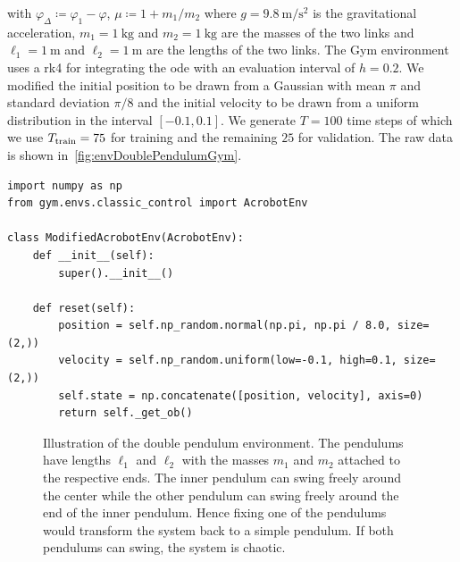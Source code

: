 			with \( \varphi_\Delta \coloneqq \varphi_1 - \varphi \), \( \mu \coloneqq 1 + m_1/m_2 \) where \( g = \SI{9.8}{\meter\per\second\squared} \) is the gravitational acceleration, \( m_1 = \SI{1}{\kilogram} \) and \( m_2 = \SI{1}{\kilogram} \) are the masses of the two links and \( \ell_1 = \SI{1}{\meter} \) and \( \ell_2 = \SI{1}{\meter} \) are the lengths of the two links. The Gym environment uses a \ac{rk4} for integrating the \ac{ode} with an evaluation interval of \( h = 0.2 \). We modified the initial position to be drawn from a Gaussian with mean \( \pi \) and standard deviation \( \pi/8 \) and the initial velocity to be drawn from a uniform distribution in the interval \( [-0.1, 0.1] \). We generate \( T = 100 \) time steps of which we use \( T_{\mathrm{train}} = 75 \) for training and the remaining \(25\) for validation. The raw data is shown in~\autoref{fig:envDoublePendulumGym}.

			\begin{lstlisting}[caption={Modification of Gym's acrobot environment to start at the top instead of hanging down.}, label=lst:topAcrobot]
import numpy as np
from gym.envs.classic_control import AcrobotEnv

class ModifiedAcrobotEnv(AcrobotEnv):
	def __init__(self):
		super().__init__()

	def reset(self):
		position = self.np_random.normal(np.pi, np.pi / 8.0, size=(2,))
		velocity = self.np_random.uniform(low=-0.1, high=0.1, size=(2,))
		self.state = np.concatenate([position, velocity], axis=0)
		return self._get_ob()
			\end{lstlisting}

			\begin{figure}
				\centering
				\tikzDoublePendulum
				\caption[Illustration of the double pendulum environment]{Illustration of the double pendulum environment. The pendulums have lengths \(\ell_1\) and \(\ell_2\) with the masses \(m_1\) and \(m_2\) attached to the respective ends. The inner pendulum can swing freely around the center while the other pendulum can swing freely around the end of the inner pendulum. Hence fixing one of the pendulums would transform the system back to a simple pendulum. If both pendulums can swing, the system is chaotic.}
				\label{fig:envDoublePendulumGymSketch}
			\end{figure}

